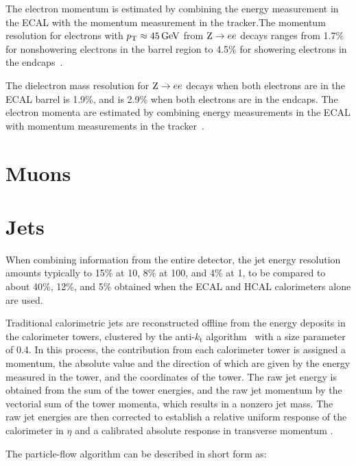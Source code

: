 The electron momentum is estimated by combining the energy measurement in the ECAL with the momentum measurement in the tracker.The momentum resolution for electrons with $p_{\mathrm{T}} \approx 45\,\text{Ge\hspace{-.08em}V}$ from $\mathrm{Z} \rightarrow {e} {e}$ decays ranges from 1.7\% for nonshowering electrons in the barrel region to 4.5\% for showering electrons in the endcaps~\cite{Khachatryan:2015hwa}.

The dielectron mass resolution for $\mathrm{Z} \rightarrow {e} {e}$ decays when both electrons are in the ECAL barrel is 1.9\%, and is 2.9\% when both electrons are in the endcaps. The electron momenta are estimated by combining energy measurements in the ECAL with momentum measurements in the tracker~\cite{Khachatryan:2015hwa}. 

\section{Muons}

\section{Jets}

When combining information from the entire detector, the jet energy resolution amounts typically to 15\% at 10\GeV, 8\% at 100\GeV, and 4\% at 1\TeV, to be compared to about 40\%, 12\%, and 5\% obtained when the ECAL and HCAL calorimeters alone are used.


Traditional calorimetric jets are reconstructed offline from the energy deposits in the calorimeter towers, clustered by the anti-$k_\mathrm{t}$ algorithm~\cite{Cacciari:2008gp, Cacciari:2011ma} with a size parameter of 0.4. In this process, the contribution from each calorimeter tower is assigned a momentum, the absolute value and the direction of which are given by the energy measured in the tower, and the coordinates of the tower. The raw jet energy is obtained from the sum of the tower energies, and the raw jet momentum by the vectorial sum of the tower momenta, which results in a nonzero jet mass. The raw jet energies are then corrected to establish a relative uniform response of the calorimeter in $\eta$ and a calibrated absolute response in transverse momentum \pt. 

 The particle-flow algorithm can be described in short form as:

